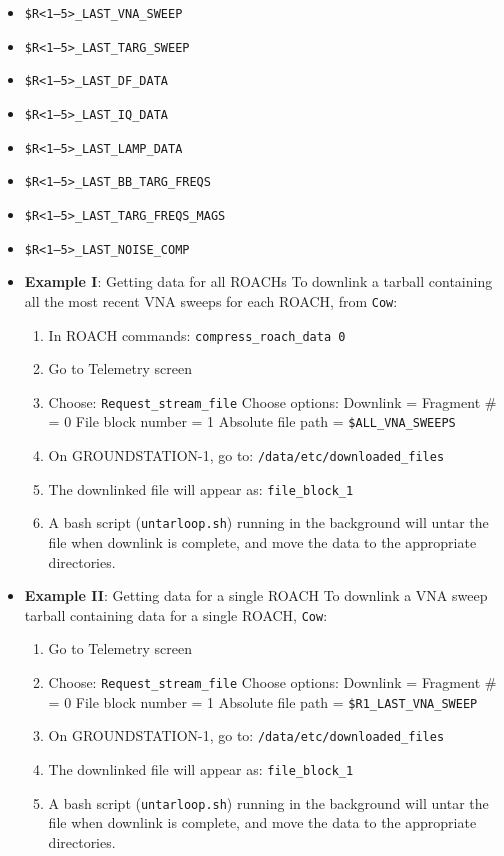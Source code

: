 \begin{itemize}[leftmargin=*,label={}]

\item \texttt{\$R<1--5>\_LAST\_VNA\_SWEEP}
\item \texttt{\$R<1--5>\_LAST\_TARG\_SWEEP}
\item \texttt{\$R<1--5>\_LAST\_DF\_DATA}
\item \texttt{\$R<1--5>\_LAST\_IQ\_DATA}
\item \texttt{\$R<1--5>\_LAST\_LAMP\_DATA}
\item \texttt{\$R<1--5>\_LAST\_BB\_TARG\_FREQS}
\item \texttt{\$R<1--5>\_LAST\_TARG\_FREQS\_MAGS}
\item \texttt{\$R<1--5>\_LAST\_NOISE\_COMP}\newline\newline

\item \textbf{Example I}: Getting data for all ROACHs
To downlink a tarball containing all the most recent VNA sweeps for each ROACH, from \texttt{Cow}:
\begin{enumerate}
  \item In ROACH commands: \texttt{compress\_roach\_data 0}
  \item Go to Telemetry screen
  \item Choose: \texttt{Request\_stream\_file}
    Choose options:
    Downlink =
    Fragment \# = 0
    File block number = 1
    Absolute file path = \texttt{\$ALL\_VNA\_SWEEPS}
  \item On GROUNDSTATION-1, go to: \texttt{/data/etc/downloaded\_files}
  \item The downlinked file will appear as: \texttt{file\_block\_1}
  \item A bash script (\texttt{untarloop.sh}) running in the background will untar the file when downlink is complete, and move the data to the appropriate directories.
\end{enumerate}

\item \textbf{Example II}: Getting data for a single ROACH
To downlink a VNA sweep tarball containing data for a single ROACH, \texttt{Cow}:
\begin{enumerate}
  \item Go to Telemetry screen
  \item Choose: \texttt{Request\_stream\_file}
    Choose options:
    Downlink =
    Fragment \# = 0
    File block number = 1
    Absolute file path = \texttt{\$R1\_LAST\_VNA\_SWEEP}
  \item On GROUNDSTATION-1, go to: \texttt{/data/etc/downloaded\_files}
  \item The downlinked file will appear as: \texttt{file\_block\_1}
  \item A bash script (\texttt{untarloop.sh}) running in the background will untar the file when downlink is complete, and move the data to the appropriate directories.
\end{enumerate}

\end{itemize}

